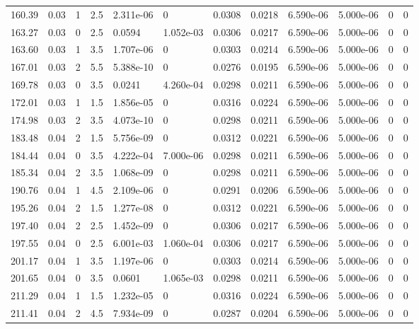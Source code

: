 \documentclass[preview]{standalone}
\begin{document}
{{{\begin{tabular}{L{1.2cm}C{1.2cm} C{0.3cm}C{0.5cm} C{1.4cm}C{1.4cm} C{1.4cm}C{1.4cm} C{1.6cm}C{1.6cm} C{1.6cm}C{1.6cm}}
  160.39  &  0.03  & 1     & 2.5 &  2.311e-06  & 0  &  0.0308&   0.0218& 6.590e-06 & 5.000e-06   &  0 & 0  \\ 
  163.27  &  0.03  & 0     & 2.5 &  0.0594  & 1.052e-03  &  0.0306&   0.0217& 6.590e-06 & 5.000e-06   &  0 & 0  \\ 
  163.60  &  0.03  & 1     & 3.5 &  1.707e-06  & 0  &  0.0303&   0.0214& 6.590e-06 & 5.000e-06   &  0 & 0  \\ 
  167.01  &  0.03  & 2     & 5.5 &  5.388e-10  & 0  &  0.0276&   0.0195& 6.590e-06 & 5.000e-06   &  0 & 0  \\ 
  169.78  &  0.03  & 0     & 3.5 &  0.0241  & 4.260e-04  &  0.0298&   0.0211& 6.590e-06 & 5.000e-06   &  0 & 0  \\ 
  172.01  &  0.03  & 1     & 1.5 &  1.856e-05  & 0  &  0.0316&   0.0224& 6.590e-06 & 5.000e-06   &  0 & 0  \\ 
  174.98  &  0.03  & 2     & 3.5 &  4.073e-10  & 0  &  0.0298&   0.0211& 6.590e-06 & 5.000e-06   &  0 & 0  \\ 
  183.48  &  0.04  & 2     & 1.5 &  5.756e-09  & 0  &  0.0312&   0.0221& 6.590e-06 & 5.000e-06   &  0 & 0  \\ 
  184.44  &  0.04  & 0     & 3.5 &  4.222e-04  & 7.000e-06  &  0.0298&   0.0211& 6.590e-06 & 5.000e-06   &  0 & 0  \\ 
  185.34  &  0.04  & 2     & 3.5 &  1.068e-09  & 0  &  0.0298&   0.0211& 6.590e-06 & 5.000e-06   &  0 & 0  \\ 
  190.76  &  0.04  & 1     & 4.5 &  2.109e-06  & 0  &  0.0291&   0.0206& 6.590e-06 & 5.000e-06   &  0 & 0  \\ 
  195.26  &  0.04  & 2     & 1.5 &  1.277e-08  & 0  &  0.0312&   0.0221& 6.590e-06 & 5.000e-06   &  0 & 0  \\ 
  197.40  &  0.04  & 2     & 2.5 &  1.452e-09  & 0  &  0.0306&   0.0217& 6.590e-06 & 5.000e-06   &  0 & 0  \\ 
  197.55  &  0.04  & 0     & 2.5 &  6.001e-03  & 1.060e-04  &  0.0306&   0.0217& 6.590e-06 & 5.000e-06   &  0 & 0  \\ 
  201.17  &  0.04  & 1     & 3.5 &  1.197e-06  & 0  &  0.0303&   0.0214& 6.590e-06 & 5.000e-06   &  0 & 0  \\ 
  201.65  &  0.04  & 0     & 3.5 &  0.0601  & 1.065e-03  &  0.0298&   0.0211& 6.590e-06 & 5.000e-06   &  0 & 0  \\ 
  211.29  &  0.04  & 1     & 1.5 &  1.232e-05  & 0  &  0.0316&   0.0224& 6.590e-06 & 5.000e-06   &  0 & 0  \\ 
  211.41  &  0.04  & 2     & 4.5 &  7.934e-09  & 0  &  0.0287&   0.0204& 6.590e-06 & 5.000e-06   &  0 & 0  \\ 

\end{tabular}}}}
\end{document}
